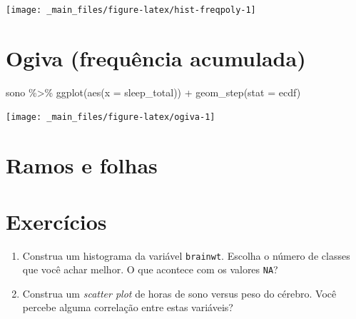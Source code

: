 \documentclass[
  12pt]{report}
\newenvironment{Shaded}{\begin{snugshade}}{\end{snugshade}}
\newcommand{\AttributeTok}[1]{\textcolor[rgb]{0.77,0.63,0.00}{#1}}
\newcommand{\DocumentationTok}[1]{\textcolor[rgb]{0.56,0.35,0.01}{\textbf{\textit{#1}}}}
\newcommand{\FunctionTok}[1]{\textcolor[rgb]{0.00,0.00,0.00}{#1}}
\newcommand{\NormalTok}[1]{#1}
\newcommand{\SpecialCharTok}[1]{\textcolor[rgb]{0.00,0.00,0.00}{#1}}
\newcommand{\StringTok}[1]{\textcolor[rgb]{0.31,0.60,0.02}{#1}}
\begin{document}
\begin{center}\texttt{[image: \_main\_files/figure-latex/hist-freqpoly-1]} \end{center}

\hypertarget{ogiva-frequuxeancia-acumulada}{%
\section{Ogiva (frequência acumulada)}\label{ogiva-frequuxeancia-acumulada}}

\begin{Shaded}
\begin{Highlighting}[]
\NormalTok{sono }\SpecialCharTok{\%\textgreater{}\%} 
  \FunctionTok{ggplot}\NormalTok{(}\FunctionTok{aes}\NormalTok{(}\AttributeTok{x =}\NormalTok{ sleep\_total)) }\SpecialCharTok{+}
  \FunctionTok{geom\_step}\NormalTok{(}\AttributeTok{stat =} \StringTok{\textquotesingle{}ecdf\textquotesingle{}}\NormalTok{)}
\end{Highlighting}
\end{Shaded}

\begin{center}\texttt{[image: \_main\_files/figure-latex/ogiva-1]} \end{center}

\hypertarget{ramos-e-folhas}{%
\section{Ramos e folhas}\label{ramos-e-folhas}}

\begin{Shaded}
\end{Shaded}

\hypertarget{exercuxedcios-3}{%
\section{Exercícios}\label{exercuxedcios-3}}

\begin{enumerate}
\def\labelenumi{\arabic{enumi}.}
\item
  Construa um histograma da variável \texttt{brainwt}. Escolha o número de classes que você achar melhor. O que acontece com os valores \texttt{NA}?
\item
  Construa um \emph{scatter plot} de horas de sono versus peso do cérebro. Você percebe alguma correlação entre estas variáveis?
\end{enumerate}
\end{document}
